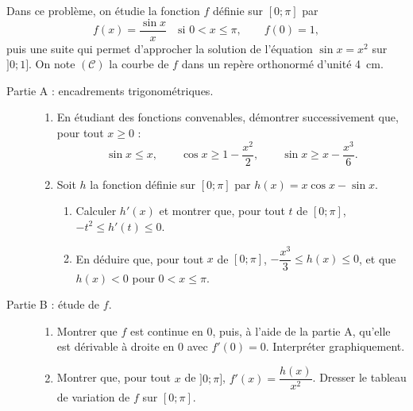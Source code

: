 \begin{exo}
\label{exo:pb sinus cardinal}
      Dans ce probl\`eme, on \'etudie la fonction $f$ d\'efinie sur $[0 ; \pi]$ par
      \[
            f(x) = \frac{\sin x}{x} \quad \text{si } 0 < x \leq \pi, \qquad f(0) = 1 ,
      \]
      puis une suite qui permet d'approcher la solution de l'\'equation $\sin x = x^2$ sur $]0 ; 1]$.
      On note $(\mathscr{C})$ la courbe de $f$ dans un rep\`ere orthonorm\'e d'unit\'e 4~cm.
      \begin{description}
            \item[Partie A : encadrements trigonom\'etriques.]
                  \begin{enumerate}
                        \item En \'etudiant des fonctions convenables, d\'emontrer successivement que, pour tout $x \geq 0$ :
                              \[
                                    \sin x \leq x , \qquad
                                    \cos x \geq 1 - \frac{x^2}{2} , \qquad
                                    \sin x \geq x - \frac{x^3}{6} .
                              \]
                        \item Soit $h$ la fonction d\'efinie sur $[0 ; \pi]$ par $h(x) = x \cos x - \sin x$.
                              \begin{enumerate}
                                    \item Calculer $h'(x)$ et montrer que, pour tout $t$ de $[0 ; \pi]$, $-t^2 \leq h'(t) \leq 0$.
                                    \item En d\'eduire que, pour tout $x$ de $[0 ; \pi]$, $-\dfrac{x^3}{3} \leq h(x) \leq 0$,
                                          et que $h(x) < 0$ pour $0 < x \leq \pi$.
                              \end{enumerate}
                  \end{enumerate}
            \item[Partie B : \'etude de $f$.]
                  \begin{enumerate}
                        \item Montrer que $f$ est continue en $0$, puis, \`a l'aide de la partie A, qu'elle est d\'erivable \`a droite
                              en $0$ avec $f'(0) = 0$. Interpr\'eter graphiquement.
                        \item Montrer que, pour tout $x$ de $]0 ; \pi]$, $f'(x) = \dfrac{h(x)}{x^2}$.
                              Dresser le tableau de variation de $f$ sur $[0 ; \pi]$.

\end{enumerate}
\end{description}
\end{exo}
